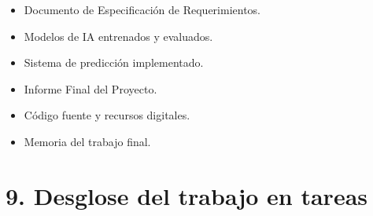 \documentclass[
11pt, %
codirector, %
]{charter}
\begin{document}
\begin{itemize}
	\item Documento de Especificación de Requerimientos.
	\item Modelos de IA entrenados y evaluados.
	\item Sistema de predicción implementado.
	\item Informe Final del Proyecto.
	\item Código fuente y recursos digitales.
	\item Memoria del trabajo final.
\end{itemize}

\section{9. Desglose del trabajo en tareas}
\label{sec:wbs}
\end{document}
